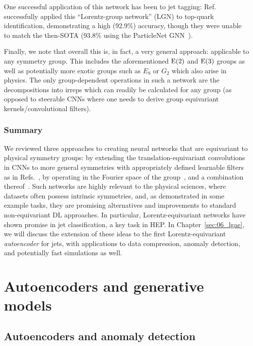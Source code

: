 One successful application of this network has been to jet tagging:
Ref.~\cite{bogatskiy2020lorentz} successfully applied this ``Lorentz-group network'' (LGN) to top-quark identification, demonstrating a high (92.9\%) accuracy, though they were unable to match the then-SOTA (93.8\% using the ParticleNet GNN~\cite{Qu:2019gqs}).

Finally, we note that overall this is, in fact, a very general approach: applicable to any symmetry group. 
This includes the aforementioned $\EE[2]$ and $\EE[3]$ groups as well as potentially more exotic groups such as $E_8$ or $G_2$ which also arise in physics. 
The only group-dependent operations in such a network are the decompositions into irreps which can readily be calculated for any group (as opposed to steerable CNNs where one needs to derive group equivariant kernels/convolutional filters). 

\subsubsection{Summary}
\label{sec:06_equivariantnns_conclusion}

We reviewed three approaches to creating neural networks that are equivariant to physical symmetry groups: by extending the translation-equivariant convolutions in CNNs to more general symmetries with appropriately defined learnable filters as in Refs.~\cite{equivariance-kernel-Cohen,equivariance-kernel-Finzi,cohen2016group}, by operating in the Fourier space of the group~\cite{bogatskiy2020lorentz}, and a combination thereof~\cite{thomas2018tensor}.
Such networks are highly relevant to the physical sciences, where datasets often possess intrinsic symmetries, and, as demonstrated in some example tasks, they are promising alternatives and improvements to standard non-equivariant DL approaches.
In particular, Lorentz-equivariant networks have shown promise in jet classification, a key task in HEP.
In Chapter~\ref{sec:06_lgae}, we will discuss the extension of these ideas to the first Lorentz-equivariant \textit{autoencoder} for jets, with applications to data compression, anomaly detection, and potentially fast simulations as well.


\section{Autoencoders and generative models}
\label{sec:03_genaes}

\subsection{Autoencoders and anomaly detection}
\label{sec:03_aes}

